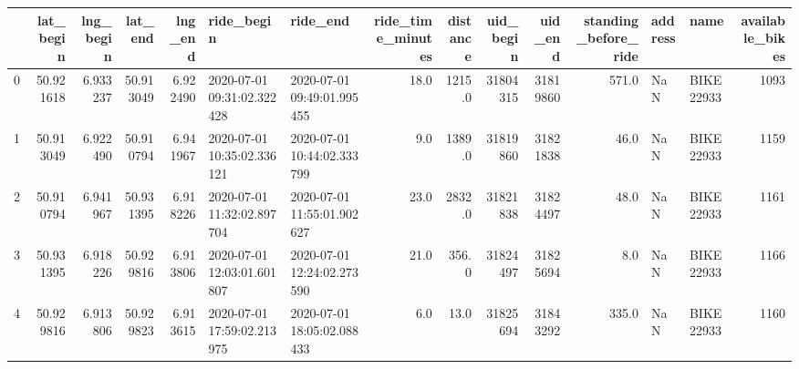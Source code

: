 \begin{tabular}{lrrrrllrrrrrllr}
\toprule
{} &  lat\_begin &  lng\_begin &    lat\_end &   lng\_end &                  ride\_begin &                    ride\_end &  ride\_time\_minutes &  distance &  uid\_begin &   uid\_end &  standing\_before\_ride & address &        name &  available\_bikes \\
\midrule
0 &  50.921618 &   6.933237 &  50.913049 &  6.922490 &  2020-07-01 09:31:02.322428 &  2020-07-01 09:49:01.995455 &               18.0 &    1215.0 &   31804315 &  31819860 &                 571.0 &     NaN &  BIKE 22933 &             1093 \\
1 &  50.913049 &   6.922490 &  50.910794 &  6.941967 &  2020-07-01 10:35:02.336121 &  2020-07-01 10:44:02.333799 &                9.0 &    1389.0 &   31819860 &  31821838 &                  46.0 &     NaN &  BIKE 22933 &             1159 \\
2 &  50.910794 &   6.941967 &  50.931395 &  6.918226 &  2020-07-01 11:32:02.897704 &  2020-07-01 11:55:01.902627 &               23.0 &    2832.0 &   31821838 &  31824497 &                  48.0 &     NaN &  BIKE 22933 &             1161 \\
3 &  50.931395 &   6.918226 &  50.929816 &  6.913806 &  2020-07-01 12:03:01.601807 &  2020-07-01 12:24:02.273590 &               21.0 &     356.0 &   31824497 &  31825694 &                   8.0 &     NaN &  BIKE 22933 &             1166 \\
4 &  50.929816 &   6.913806 &  50.929823 &  6.913615 &  2020-07-01 17:59:02.213975 &  2020-07-01 18:05:02.088433 &                6.0 &      13.0 &   31825694 &  31843292 &                 335.0 &     NaN &  BIKE 22933 &             1160 \\
\bottomrule
\end{tabular}
